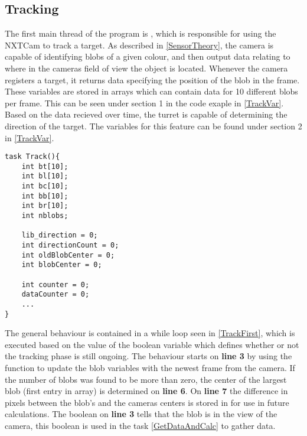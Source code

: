 \subsection{Tracking}
The first main thread of the program is , which is responsible
for using the NXTCam to track a target. As described in \autoref{SensorTheory}, the camera
is capable of identifying blobs of a given colour, and then output data relating to where
in the cameras field of view the object is located. Whenever the camera
registers a target, it returns data specifying the position of the blob in the
frame. These variables are stored in arrays which can contain data for 10
different blobs per frame. This can be seen under section 1 in the code exaple
in \autoref{TrackVar}. Based on the data recieved over time, the turret is
capable of determining the direction of the target. The variables
for this feature can be found under section 2 in \autoref{TrackVar}.\nl
 
\begin{minipage}[H]{\linewidth}
\begin{lstlisting}[caption = Variables used on the Track() thread., label = TrackVar, style = nc] 
task Track(){
    int bt[10];
    int bl[10];
    int bc[10];
    int bb[10];
    int br[10];
    int nblobs;

    lib_direction = 0;
    int directionCount = 0;
    int oldBlobCenter = 0;
    int blobCenter = 0;

    int counter = 0;
    dataCounter = 0;
    ...
}
\end{lstlisting}
\end{minipage}

The general behaviour is contained in a while loop seen in \autoref{TrackFirst},
which is executed based on the value of the boolean variable
 which defines whether or not the tracking phase is still
ongoing. The behaviour starts on \textbf{line 3} by using the
 function to update the blob variables with
the newest frame from the camera. If the number of blobs was found to be more
than zero, the center of the largest blob (first entry in array) is determined on
\textbf{line 6}. On \textbf{line 7} the difference in pixels between the blob's
and the cameras centers is stored in  for use in future
calculations. The boolean on \textbf{line 3} tells that the blob is in the view
of the camera, this boolean is used in the  task
\autoref{GetDataAndCalc} to gather data.\nl
  
